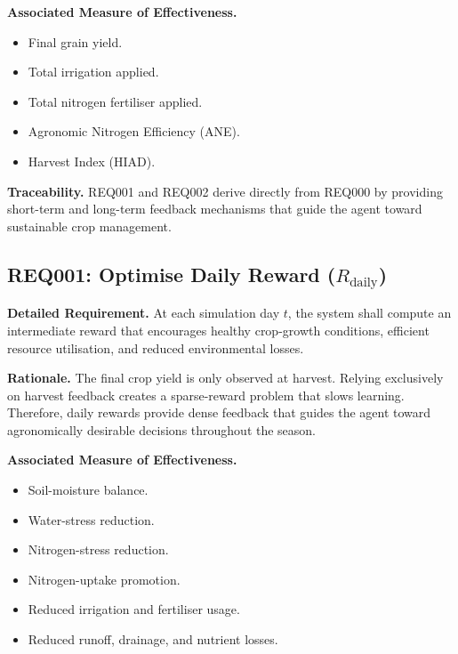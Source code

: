 \vspace{0.2cm}
\noindent\textbf{Associated Measure of Effectiveness.}
\begin{itemize}
    \item Final grain yield.
    \item Total irrigation applied.
    \item Total nitrogen fertiliser applied.
    \item Agronomic Nitrogen Efficiency (ANE).
    \item Harvest Index (HIAD).
\end{itemize}

\vspace{0.2cm}
\noindent\textbf{Traceability.}
REQ001 and REQ002 derive directly from REQ000 by providing short-term and long-term
feedback mechanisms that guide the agent toward sustainable crop management.

\subsection{REQ001: Optimise Daily Reward ($R_{\text{daily}}$)}

\noindent\textbf{Detailed Requirement.}
At each simulation day $t$, the system shall compute an intermediate reward that
encourages healthy crop-growth conditions, efficient resource utilisation, and reduced
environmental losses.

\vspace{0.2cm}
\noindent\textbf{Rationale.}
The final crop yield is only observed at harvest. Relying exclusively on harvest
feedback creates a sparse-reward problem that slows learning. Therefore, daily rewards
provide dense feedback that guides the agent toward agronomically desirable decisions
throughout the season.

\vspace{0.2cm}
\noindent\textbf{Associated Measure of Effectiveness.}
\begin{itemize}
    \item Soil-moisture balance.
    \item Water-stress reduction.
    \item Nitrogen-stress reduction.
    \item Nitrogen-uptake promotion.
    \item Reduced irrigation and fertiliser usage.
    \item Reduced runoff, drainage, and nutrient losses.
\end{itemize}


